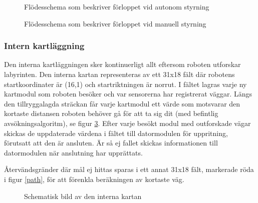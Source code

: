 \documentclass[11pt]{article}
\begin{document}
\begin{flushleft}
\begin{figure}[htbp]
\centering
\noindent\resizebox{0.9\linewidth}{!}{
	}
	\cprotect\caption{Flödesschema som beskriver förloppet vid autonom styrning \label{autonomousMode}}	
\end{figure}

\begin{figure}[htbp]
\centering
\noindent\resizebox{0.9\linewidth}{!}{
	}
	\cprotect\caption{Flödesschema som beskriver förloppet vid manuell styrning \label{manualMode}}	
\end{figure}

\subsubsection{Intern kartläggning} \label{search}
Den interna kartläggningen sker kontinuerligt allt eftersom roboten utforskar labyrinten. Den interna kartan representeras av ett 31x18 fält där robotens startkoordinater är (16,1) och startriktningen är norrut. I fältet lagras varje ny kartmodul som roboten besöker och var sensorerna har registrerat väggar. Längs den tillryggalagda sträckan får varje kartmodul ett värde som motsvarar den kortaste distansen roboten behöver gå för att ta sig dit (med befintlig avsökningsalgoritm), se figur \ref{map}. Efter varje besökt modul med outforskade vägar skickas de uppdaterade värdena i fältet till datormodulen för uppritning, förutsatt att den är ansluten. Är så ej fallet skickas informationen till datormodulen när anslutning har upprättats. 

Återvändsgränder där mål ej hittas sparas i ett annat 31x18 fält, markerade röda i figur \ref{path}, för att förenkla beräkningen av kortaste väg. 

\begin{figure}[htbp]
\centering
\noindent\resizebox{0.7\linewidth}{!}{
	}
	\caption{Schematisk bild av den interna kartan}	\label{map}
\end{figure}


\end{flushleft}
\end{document}
